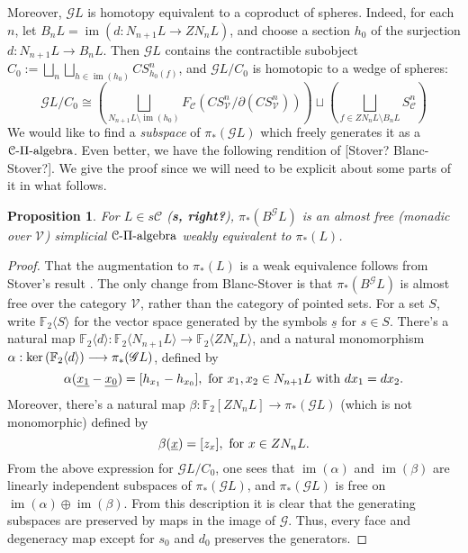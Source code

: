 \documentclass[11pt]{amsart}
\theoremstyle{plain}
\newtheorem{prop}[thm]{Proposition}
\theoremstyle{definition}
\renewcommand{\ker}{\textup{ker}\,}
\DeclareMathOperator{\im}{im}
\renewcommand{\to}{\longrightarrow}
\newcommand{\scrG}{\mathscr{G}}
\newcommand{\calC}{\mathcal{C}}
\newcommand{\calV}{\mathcal{V}}
\theoremstyle{plain}
\newcommand{\vect}[2]{\calV^{#1}_{#2}}
\newcommand{\BSW}{{\scrG}}
\newcommand{\F}{\mathbb{F}}
\begin{document}
\begin{Composite functor spectral sequences}
Moreover, $\BSW L$ is homotopy equivalent to a coproduct of spheres. Indeed, for each $n$, let $B_nL=\im (d:N_{n+1}L\to ZN_nL)$, and choose a section $h_0$ of the surjection $d:N_{n+1}L\to B_nL$. Then $\BSW L$ contains the contractible subobject $C_0:=\bigsqcup_n\bigsqcup_{h\in \im (h_0)} CS^n_{h_0(f)}$, and $\BSW L/C_0$ is homotopic to a wedge of spheres:
\[\BSW L/C_0\cong \left(\bigsqcup_{N_{n+1}L\setminus\im (h_0)}F_\calC (CS^n_{\vect{}{}}/\partial(CS^n_{\vect{}{}}))\right) \sqcup\left(\bigsqcup_{f\in ZN_nL\setminus B_nL}S^n_\calC\right)\]
We would like to find a \emph{subspace} of $\pi_*(\BSW L)$ which freely generates it as a $\calC\textup{-$\Pi$-algebra}$. Even better, we have the following rendition of [Stover? Blanc-Stover?]. We give the proof since we will need to be explicit about some parts of it in what follows.
\begin{prop}
For $L\in s\calC$ (\textbf{s, right?}), $\pi_*(B^{\BSW}L)$ is an almost free (monadic over $\vect{}{}$) simplicial $\calC\textup{-$\Pi$-algebra}$ weakly equivalent to $\pi_*(L)$.
\end{prop}
\begin{proof}
That the augmentation to $\pi_*(L)$ is a weak equivalence follows from Stover's result \cite[2.7]{StoverVanKampen.pdf}. The only change from Blanc-Stover is that $\pi_*(B^{\BSW}L)$ is almost free over the category $\vect{}{}$, rather than the category of pointed sets.
For a set $S$, write $\F_2\langle S\rangle$ for the vector space generated by the symbols $\underline{s}$ for $s\in S$. There's a natural map $\F_2\langle d\rangle :\F_2\langle N_{n+1}L\rangle \to \F_2\langle ZN_nL\rangle $, and a natural monomorphism $\alpha:\ker(\F_2\langle d\rangle)\to \pi_*(\BSW L)$, defined by
\[\alpha(\underline{x_1}-\underline{x_0})=[h_{x_1}-h_{x_0}],\textup{ for $x_1,x_2\in N_{n+1}L$ with $dx_1=dx_2$}.\]
Moreover, there's a natural map $\beta:\F_2[ZN_nL]\to\pi_*(\BSW L)$ (which is not monomorphic) defined by
\[\beta(\underline{x})=[z_{x}],\textup{ for $x\in ZN_{n}L$}.\]
From the above expression for $\BSW L/C_0$, one sees that $\im (\alpha)$ and $\im (\beta)$ are linearly independent subspaces of $\pi_*(\BSW L)$, and $\pi_*(\BSW L)$ is free on $\im (\alpha)\oplus\im (\beta)$. From this description it is clear that the generating subspaces are preserved by maps in the image of $\BSW $. Thus, every face and degeneracy map except for $s_0$ and $d_0$ preserves the generators.


\end{proof}
\end{Composite functor spectral sequences}
\end{document}
